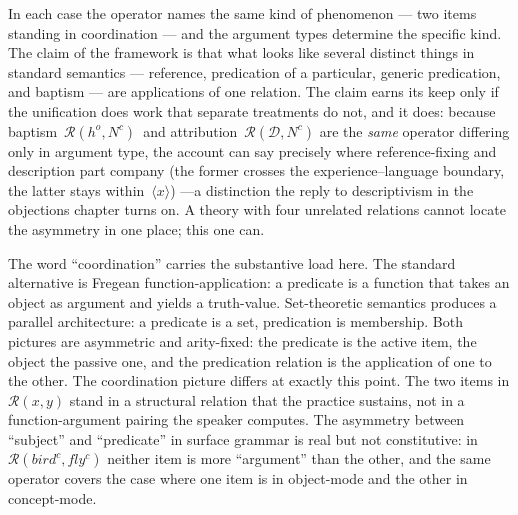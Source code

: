 \documentclass[12pt,a4paper]{article}
\begin{document}
In each case the operator names the same kind of phenomenon --- two items standing in coordination --- and the argument types determine the specific kind. The claim of the framework is that what looks like several distinct things in standard semantics --- reference, predication of a particular, generic predication, and baptism --- are applications of one relation. The claim earns its keep only if the unification does work that separate treatments do not, and it does: because baptism~\(\mathcal{R}(h^o,N^c)\)~and attribution~\(\mathcal{R}(\mathcal{D},N^c)\) are the \emph{same} operator differing only in argument type, the account can say precisely where reference-fixing and description part company (the former crosses the experience--language boundary, the latter stays within~\(⟨x⟩\)) ---a distinction the reply to descriptivism in the objections chapter turns on. A theory with four unrelated relations cannot locate the asymmetry in one place; this one can.

The word ``coordination'' carries the substantive load here. The standard alternative is Fregean function-application: a predicate is a function that takes an object as argument and yields a truth-value. Set-theoretic semantics produces a parallel architecture: a predicate is a set, predication is membership. Both pictures are asymmetric and arity-fixed: the predicate is the active item, the object the passive one, and the predication relation is the application of one to the other. The coordination picture differs at exactly this point. The two items in \(\mathcal{R}(x, y)\) stand in a structural relation that the practice sustains, not in a function-argument pairing the speaker computes. The asymmetry between ``subject'' and ``predicate'' in surface grammar is real but not constitutive: in \(\mathcal{R}(bird^c, fly^c)\) neither item is more ``argument'' than the other, and the same operator covers the case where one item is in object-mode and the other in concept-mode.
\end{document}
